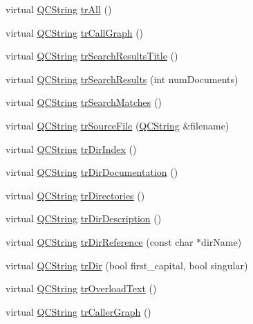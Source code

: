 \begin{DoxyCompactItemize}
virtual \hyperlink{class_q_c_string}{Q\-C\-String} \hyperlink{class_translator_greek_afba06c0d2fb2ce2775c541d44b805758}{tr\-All} ()
\item 
virtual \hyperlink{class_q_c_string}{Q\-C\-String} \hyperlink{class_translator_greek_a5eb7947fa59555756d25476f922cde01}{tr\-Call\-Graph} ()
\item 
virtual \hyperlink{class_q_c_string}{Q\-C\-String} \hyperlink{class_translator_greek_a711c6a2b5461f1f055d00611ea3a0533}{tr\-Search\-Results\-Title} ()
\item 
virtual \hyperlink{class_q_c_string}{Q\-C\-String} \hyperlink{class_translator_greek_ae43fbd8a6b08b331a6586422bd8c465e}{tr\-Search\-Results} (int num\-Documents)
\item 
virtual \hyperlink{class_q_c_string}{Q\-C\-String} \hyperlink{class_translator_greek_a0677855fd52afcda6d47b2cc51e7de31}{tr\-Search\-Matches} ()
\item 
virtual \hyperlink{class_q_c_string}{Q\-C\-String} \hyperlink{class_translator_greek_a1b3571c6c75d16ebe3763f510bd95b68}{tr\-Source\-File} (\hyperlink{class_q_c_string}{Q\-C\-String} \&filename)
\item 
virtual \hyperlink{class_q_c_string}{Q\-C\-String} \hyperlink{class_translator_greek_ae9895001e5d8629fd068895b2ffa653f}{tr\-Dir\-Index} ()
\item 
virtual \hyperlink{class_q_c_string}{Q\-C\-String} \hyperlink{class_translator_greek_a89a223d69d1255271719c256b2fd451b}{tr\-Dir\-Documentation} ()
\item 
virtual \hyperlink{class_q_c_string}{Q\-C\-String} \hyperlink{class_translator_greek_ab7610b46aedb923a1524272dfbaeab38}{tr\-Directories} ()
\item 
virtual \hyperlink{class_q_c_string}{Q\-C\-String} \hyperlink{class_translator_greek_abf769d2a217fcf6b9d3b9170fbbae7c8}{tr\-Dir\-Description} ()
\item 
virtual \hyperlink{class_q_c_string}{Q\-C\-String} \hyperlink{class_translator_greek_ae680136bec0ce1d29a1e4e00d871797f}{tr\-Dir\-Reference} (const char $\ast$dir\-Name)
\item 
virtual \hyperlink{class_q_c_string}{Q\-C\-String} \hyperlink{class_translator_greek_abb2b35bd374b96530198bf061054c951}{tr\-Dir} (bool first\-\_\-capital, bool singular)
\item 
virtual \hyperlink{class_q_c_string}{Q\-C\-String} \hyperlink{class_translator_greek_ac5436cb286c48cd540d0cdce200a82b9}{tr\-Overload\-Text} ()
\item 
virtual \hyperlink{class_q_c_string}{Q\-C\-String} \hyperlink{class_translator_greek_ae1d7d38cc426cd25124b1658b1125841}{tr\-Caller\-Graph} ()

\end{DoxyCompactItemize}
